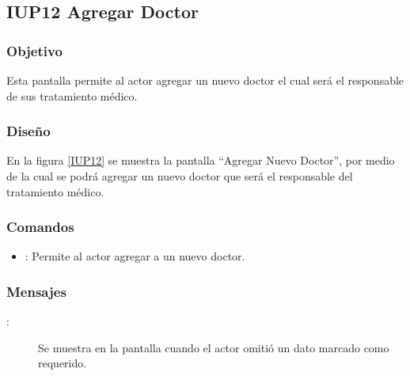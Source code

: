 \subsection{IUP12 Agregar Doctor}
 
\subsubsection{Objetivo}

    Esta pantalla permite al actor agregar un nuevo doctor el cual será el responsable de sus tratamiento médico.

\subsubsection{Diseño}

    En la figura \ref{IUP12} se muestra la pantalla ``Agregar Nuevo Doctor'', por medio de la cual se podrá agregar un nuevo doctor que será el responsable del tratamiento médico. \\


\subsubsection{Comandos}
\begin{itemize}
    \item {}: Permite al actor agregar a un nuevo doctor.
    
\end{itemize}

\subsubsection{Mensajes}

\begin{description}
    \item[:] Se muestra en la pantalla  cuando el actor omitió un dato marcado como requerido.
    
\end{description}
